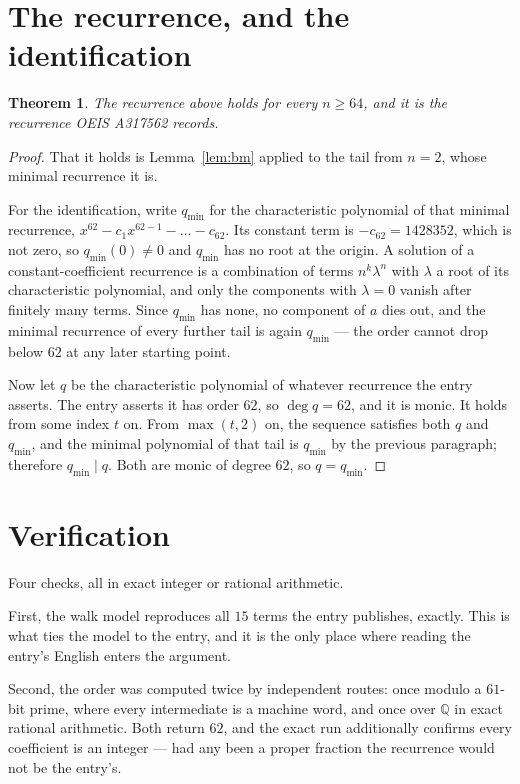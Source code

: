 \documentclass[11pt,a4paper]{article}
\theoremstyle{plain}
\newtheorem{theorem}{Theorem}
\theoremstyle{definition}
\begin{document}
\section{The recurrence, and the identification}

\begin{theorem}
The recurrence above holds for every $n\ge64$, and it is the recurrence OEIS A317562 records.
\end{theorem}

\begin{proof}
That it holds is Lemma~\ref{lem:bm} applied to the tail from $n=2$, whose minimal
recurrence it is.

For the identification, write $q_{\min}$ for the characteristic polynomial of that minimal
recurrence, $x^{62}-c_1x^{62-1}-\dots-c_{62}$. Its constant term is
$-c_{62}=1428352$, which is not zero, so $q_{\min}(0)\neq0$ and $q_{\min}$ has no
root at the origin. A solution of a constant-coefficient recurrence is a combination of terms
$n^{k}\lambda^{n}$ with $\lambda$ a root of its characteristic polynomial, and only the
components with $\lambda=0$ vanish after finitely many terms. Since $q_{\min}$ has none, no
component of $a$ dies out, and the minimal recurrence of every further tail is again
$q_{\min}$ --- the order cannot drop below $62$ at any later starting point.

Now let $q$ be the characteristic polynomial of whatever recurrence the entry asserts. The
entry asserts it has order $62$, so $\deg q=62$, and it is monic. It holds from some
index $t$ on. From $\max(t,2)$ on, the sequence satisfies both $q$ and $q_{\min}$, and
the minimal polynomial of that tail is $q_{\min}$ by the previous paragraph; therefore
$q_{\min}\mid q$. Both are monic of degree $62$, so $q=q_{\min}$.
\end{proof}

\section{Verification}

Four checks, all in exact integer or rational arithmetic.

First, the walk model reproduces all $15$ terms the entry publishes, exactly. This is
what ties the model to the entry, and it is the only place where reading the entry's English
enters the argument.

Second, the order was computed twice by independent routes: once modulo a $61$-bit prime, where
every intermediate is a machine word, and once over $\mathbb{Q}$ in exact rational arithmetic.
Both return $62$, and the exact run additionally confirms every coefficient is an integer
--- had any been a proper fraction the recurrence would not be the entry's.
\end{document}
